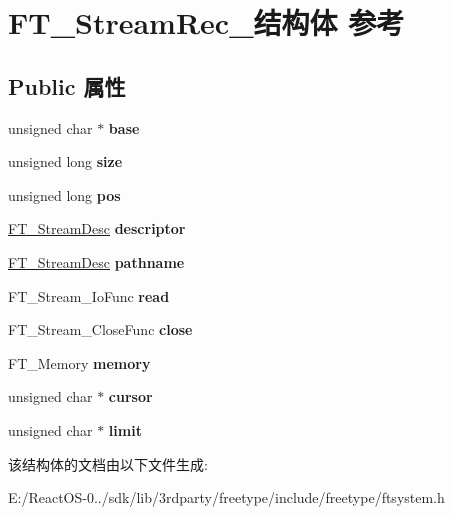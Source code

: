 \hypertarget{struct_f_t___stream_rec__}{}\section{F\+T\+\_\+\+Stream\+Rec\+\_\+结构体 参考}
\label{struct_f_t___stream_rec__}
\subsection*{Public 属性}
\begin{DoxyCompactItemize}
\item 
\mbox{\label{struct_f_t___stream_rec___a7b406cb9a60c5a8b4bd8d04b7a23cfee}} 
unsigned char $\ast$ {\bfseries base}
\item 
\mbox{\label{struct_f_t___stream_rec___ab00e3cf802c950d0ca5a022a06953123}} 
unsigned long {\bfseries size}
\item 
\mbox{\label{struct_f_t___stream_rec___a5bf82c2ff4554752edfeec442fba2f33}} 
unsigned long {\bfseries pos}
\item 
\mbox{\label{struct_f_t___stream_rec___a361c44020eace21cc453b51852d8cc4f}} 
\hyperlink{union_f_t___stream_desc__}{F\+T\+\_\+\+Stream\+Desc} {\bfseries descriptor}
\item 
\mbox{\label{struct_f_t___stream_rec___afd75c5de5ed78c484a200a7e97ef5a41}} 
\hyperlink{union_f_t___stream_desc__}{F\+T\+\_\+\+Stream\+Desc} {\bfseries pathname}
\item 
\mbox{\label{struct_f_t___stream_rec___af724049d0258d4988c2b11c3a08b1b05}} 
F\+T\+\_\+\+Stream\+\_\+\+Io\+Func {\bfseries read}
\item 
\mbox{\label{struct_f_t___stream_rec___a7d7c7a1d7de8f580d7ad66efe89defa9}} 
F\+T\+\_\+\+Stream\+\_\+\+Close\+Func {\bfseries close}
\item 
\mbox{\label{struct_f_t___stream_rec___a51e2be0d80d70b532aae3face5461e7e}} 
F\+T\+\_\+\+Memory {\bfseries memory}
\item 
\mbox{\label{struct_f_t___stream_rec___ab7dbbad87d8b6d0178771a06e1ce8b4d}} 
unsigned char $\ast$ {\bfseries cursor}
\item 
\mbox{\label{struct_f_t___stream_rec___aff006e6ee3bbc2741a2c4ae79b1bad3a}} 
unsigned char $\ast$ {\bfseries limit}
\end{DoxyCompactItemize}


该结构体的文档由以下文件生成\+:\begin{DoxyCompactItemize}
\item 
E\+:/\+React\+O\+S-\/0../sdk/lib/3rdparty/freetype/include/freetype/ftsystem.\+h\end{DoxyCompactItemize}
